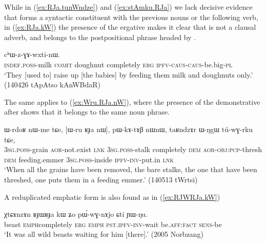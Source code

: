 While in (\ref{ex:RJa.tunWndze})  and (\ref{ex:stAmku.RJa}) we lack decisive evidence that  forms a syntactic constituent with the previous nouns or the following verb, in (\ref{ex:RJa.kW}) the presence of the ergative makes it clear that  is not a clausal adverb, and belongs to the postpositional phrase headed by .

\begin{exe}
\ex \label{ex:RJa.kW}
  cʰɯ-z-ɣɤ-wxti-nɯ. \\
 \textsc{indef}.\textsc{poss}-milk \textsc{comit} doughnut completely \textsc{erg} \textsc{ipfv}-\textsc{caus}-\textsc{caus}-be.big-\textsc{pl} \\
\glt `They [used to] raise up [the babies] by feeding them milk and doughnuts only.' (140426 tApAtso kAnWBdaR)
\end{exe}

The same applies to (\ref{ex:Wru.RJa.nW}), where the presence of the demonstrative  after  shows that it belongs to the same noun phrase.

\begin{exe}
\ex \label{ex:Wru.RJa.nW}
 \gll ɯ-rdoʁ nɯ-me tɕe, [ɯ-ru ʁɟa nɯ], pɯ-kɤ-tɤβ nɯnɯ, taʁndzɤr ɯ-ŋgɯ tú-wɣ-rku tɕe, \\
 \textsc{3sg}.\textsc{poss}-grain \textsc{aor}-not.exist \textsc{lnk} \textsc{3sg}.\textsc{poss}-stalk completely \textsc{dem} \textsc{aor}-\textsc{obj}:\textsc{pcp}-thresh \textsc{dem} feeding.emmer \textsc{3sg}.\textsc{poss}-inside \textsc{ipfv}-\textsc{inv}-put.in \textsc{lnk} \\
 \glt `When all the grains have been removed, the bare stalks, the one that have been threshed, one puts them in a feeding emmer.' (140513 tWrtsi)
\end{exe}


A reduplicated emphatic form  is also found as in (\ref{ex:RJWRJa.kW})

\begin{exe}
\ex \label{ex:RJWRJa.kW}
 \gll χtɕɤnzɤn ʁɟɯ\redp{}ʁɟa kɯ ʑo pɯ́-wɣ-nɤjo ɕti ɲɯ-ŋu.  \\
beast \textsc{emph}\redp{}completely \textsc{erg} \textsc{emph} \textsc{pst}.\textsc{ipfv}-\textsc{inv}-wait be.\textsc{aff}:\textsc{fact} \textsc{sens}-be \\
\glt `It was all wild beasts waiting for him [there].' (2005 Norbzang)
 \end{exe}
 
